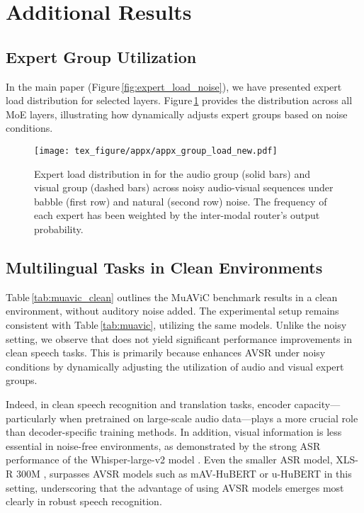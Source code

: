 \section{Additional Results}
\label{appx:additional_results}

\subsection{Expert Group Utilization}
\label{appx:expert_group_usage}

In the main paper (Figure\,\ref{fig:expert_load_noise}), we have presented expert load distribution for selected layers. Figure\,\ref{fig:appx_group_load} provides the distribution across all MoE layers, illustrating how \ourmodel dynamically adjusts expert groups based on noise conditions.

\begin{figure}[!h]
    \centering
    \texttt{[image: tex\_figure/appx/appx\_group\_load\_new.pdf]}
    \vspace{-20pt}
    \caption{Expert load distribution in \ourmodel for the audio group (solid bars) and visual group (dashed bars) across noisy audio-visual sequences under babble (first row) and natural (second row) noise. The frequency of each expert has been weighted by the inter-modal router's output probability.}
    \label{fig:appx_group_load}
\end{figure}


\subsection{Multilingual Tasks in Clean Environments}

Table\,\ref{tab:muavic_clean} outlines the MuAViC benchmark results in a clean environment, without auditory noise added. The experimental setup remains consistent with Table\,\ref{tab:muavic}, utilizing the same models. Unlike the noisy setting, we observe that \ourmodel does not yield significant performance improvements in clean speech tasks. This is primarily because \ourmodel enhances AVSR under noisy conditions by dynamically adjusting the utilization of audio and visual expert groups. 

Indeed, in clean speech recognition and translation tasks, encoder capacity---particularly when pretrained on large-scale audio data---plays a more crucial role than decoder-specific training methods. In addition, visual information is less essential in noise-free environments, as demonstrated by the strong ASR performance of the Whisper-large-v2 model \cite{radford2023robust}. Even the smaller ASR model, XLS-R 300M \cite{babu2022xls}, surpasses AVSR models such as mAV-HuBERT \cite{anwar2023muavic} or u-HuBERT \cite{hsu2022u} in this setting, underscoring that the advantage of using AVSR models emerges most clearly in robust speech recognition.

